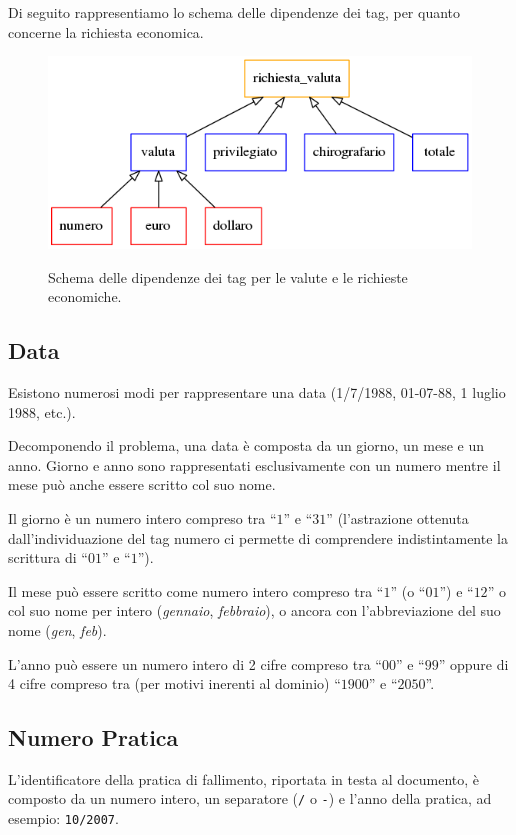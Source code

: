 Di seguito rappresentiamo lo schema delle dipendenze dei tag, per quanto concerne la richiesta economica.

\begin{figure}[H]
\centering
\includegraphics[width=.7\textwidth]{img/valuta.png}
\label{fig:valuta}
\caption[Dipendenze tra tag - Valute]{Schema delle dipendenze dei tag per le valute e le richieste economiche.}
\end{figure}

\subsection{Data}
Esistono numerosi modi per rappresentare una data (1/7/1988, 01-07-88, 1 luglio 1988, etc.).

Decomponendo il problema, una data è composta da un giorno, un mese e un anno.
Giorno e anno sono rappresentati esclusivamente con un numero mentre il mese può anche essere scritto col suo nome.

Il giorno è un numero intero compreso tra ``$1$'' e ``$31$'' (l'astrazione ottenuta dall'individuazione del tag numero ci permette di comprendere indistintamente la scrittura di ``$01$'' e ``$1$'').

Il mese può essere scritto come numero intero compreso tra ``$1$'' (o ``$01$'') e ``$12$'' o col suo nome per intero (\emph{gennaio}, \emph{febbraio}), o ancora con l'abbreviazione del suo nome (\emph{gen}, \emph{feb}).

L'anno può essere un numero intero di 2 cifre compreso tra ``$00$'' e ``$99$'' oppure di 4 cifre compreso tra (per motivi inerenti al dominio) ``$1900$'' e ``$2050$''.

\subsection{Numero Pratica}
L'identificatore della pratica di fallimento, riportata in testa al documento, è composto da un numero intero, un separatore (\verb|/| o \verb|-|) e l'anno della pratica, ad esempio: \verb|10/2007|.

